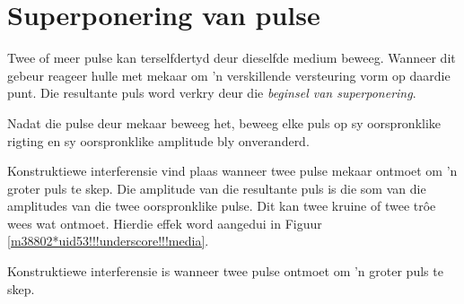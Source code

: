 \section{Superponering van pulse}

Twee of meer pulse kan terselfdertyd deur dieselfde medium beweeg. Wanneer dit gebeur reageer hulle met mekaar om 'n verskillende versteuring vorm op daardie punt. Die resultante puls word verkry deur die \textsl{beginsel van superponering}.


Nadat die pulse deur mekaar beweeg het, beweeg elke puls op sy oorspronklike rigting en sy oorspronklike amplitude bly onveranderd. \par

Konstruktiewe interferensie vind plaas wanneer twee pulse mekaar ontmoet om 'n groter puls te skep. Die amplitude van die resultante puls is die som van die amplitudes van die twee oorspronklike pulse. Dit kan twee kruine of twee tr\^oe wees wat ontmoet. Hierdie effek word aangedui in Figuur \ref{m38802*uid53!!!underscore!!!media}.\par 

 {
     Konstruktiewe interferensie is wanneer twee pulse ontmoet om 'n groter puls te skep.
       } 
	
